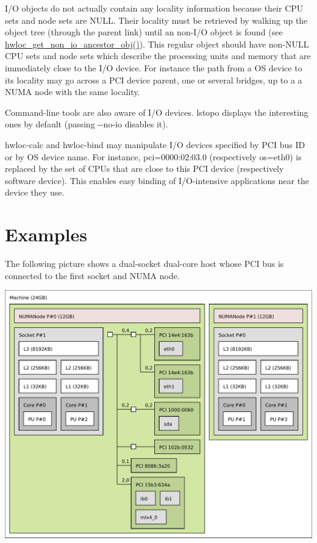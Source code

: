 I/O objects do not actually contain any locality information because their CPU sets and node sets are NULL. Their locality must be retrieved by walking up the object tree (through the {\ttfamily parent} link) until an non-\/I/O object is found (see \hyperlink{a00064_ga3603275746a8792e54415d79763aa9e9}{hwloc\_\-get\_\-non\_\-io\_\-ancestor\_\-obj()}). This regular object should have non-\/NULL CPU sets and node sets which describe the processing units and memory that are immediately close to the I/O device. For instance the path from a OS device to its locality may go across a PCI device parent, one or several bridges, up to a a NUMA node with the same locality.

Command-\/line tools are also aware of I/O devices. lstopo displays the interesting ones by default (passing {\ttfamily -\/-\/no-\/io} disables it).

hwloc-\/calc and hwloc-\/bind may manipulate I/O devices specified by PCI bus ID or by OS device name. For instance, {\ttfamily pci=0000:02:03.0} (respectively {\ttfamily os=eth0}) is replaced by the set of CPUs that are close to this PCI device (respectively software device). This enables easy binding of I/O-\/intensive applications near the device they use.\hypertarget{a00005_iodevices_examples}{}\section{Examples}\label{a00005_iodevices_examples}
The following picture shows a dual-\/socket dual-\/core host whose PCI bus is connected to the first socket and NUMA node.

 
\begin{DoxyImageNoCaption}
  \mbox{\includegraphics[width=\textwidth]{devel09-pci}}
\end{DoxyImageNoCaption}


